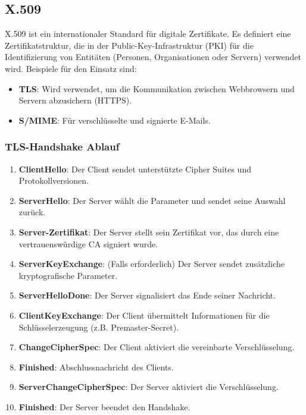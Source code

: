 \documentclass{article}
\begin{document}
\subsection{X.509}

X.509 ist ein internationaler Standard für digitale Zertifikate. Es definiert eine Zertifikatstruktur, die in der Public-Key-Infrastruktur (PKI) für die Identifizierung von Entitäten (Personen, Organisationen oder Servern) verwendet wird. Beispiele für den Einsatz sind:

\begin{itemize}
  \item \textbf{TLS}: Wird verwendet, um die Kommunikation zwischen Webbrowsern und Servern abzusichern (HTTPS).
  \item \textbf{S/MIME}: Für verschlüsselte und signierte E-Mails.
\end{itemize}

\subsubsection{TLS-Handshake Ablauf}
\begin{enumerate}
  \item \textbf{ClientHello}: Der Client sendet unterstützte Cipher Suites und Protokollversionen.
  \item \textbf{ServerHello}: Der Server wählt die Parameter und sendet seine Auswahl zurück.
  \item \textbf{Server-Zertifikat}: Der Server stellt sein Zertifikat vor, das durch eine vertrauenswürdige CA signiert wurde.
  \item \textbf{ServerKeyExchange}: (Falls erforderlich) Der Server sendet zusätzliche kryptografische Parameter.
  \item \textbf{ServerHelloDone}: Der Server signalisiert das Ende seiner Nachricht.
  \item \textbf{ClientKeyExchange}: Der Client übermittelt Informationen für die Schlüsselerzeugung (z.B. Premaster-Secret).
  \item \textbf{ChangeCipherSpec}: Der Client aktiviert die vereinbarte Verschlüsselung.
  \item \textbf{Finished}: Abschlussnachricht des Clients.
  \item \textbf{ServerChangeCipherSpec}: Der Server aktiviert die Verschlüsselung.
  \item \textbf{Finished}: Der Server beendet den Handshake.
\end{enumerate}
\end{document}
